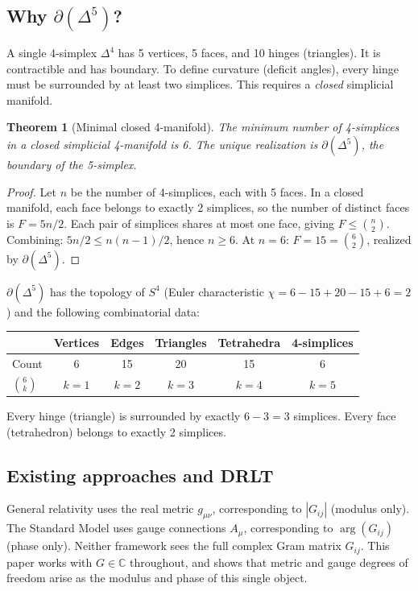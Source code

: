 \documentclass[12pt,a4paper]{article}
\newtheorem{theorem}{Theorem}[section]
\newcommand{\CC}{\mathbb{C}}
\begin{document}
\subsection{Why $\partial(\Delta^5)$?}

A single 4-simplex $\Delta^4$ has 5 vertices, 5 faces, and
10 hinges (triangles). It is contractible and has boundary.
To define curvature (deficit angles), every hinge must be
surrounded by at least two simplices.  This requires a
\emph{closed} simplicial manifold.

\begin{theorem}[Minimal closed 4-manifold]
\label{thm:minimal}
The minimum number of 4-simplices in a closed simplicial
4-manifold is 6.  The unique realization is $\partial(\Delta^5)$,
the boundary of the 5-simplex.
\end{theorem}

\begin{proof}
Let $n$ be the number of 4-simplices, each with 5 faces.
In a closed manifold, each face belongs to exactly 2 simplices,
so the number of distinct faces is $F = 5n/2$.
Each pair of simplices shares at most one face, giving
$F \leq \binom{n}{2}$.  Combining:
$5n/2 \leq n(n-1)/2$, hence $n \geq 6$.
At $n = 6$: $F = 15 = \binom{6}{2}$, realized by $\partial(\Delta^5)$.
\end{proof}

$\partial(\Delta^5)$ has the topology of $S^4$ (Euler
characteristic $\chi = 6 - 15 + 20 - 15 + 6 = 2$) and the
following combinatorial data:

\begin{center}
\begin{tabular}{lccccc}
\toprule
 & Vertices & Edges & Triangles & Tetrahedra & 4-simplices \\
\midrule
Count & 6 & 15 & 20 & 15 & 6 \\
$\binom{6}{k}$ & $k=1$ & $k=2$ & $k=3$ & $k=4$ & $k=5$ \\
\bottomrule
\end{tabular}
\end{center}

Every hinge (triangle) is surrounded by exactly $6-3 = 3$
simplices.  Every face (tetrahedron) belongs to exactly 2
simplices.

\subsection{Existing approaches and DRLT}

General relativity uses the real metric $g_{\mu\nu}$,
corresponding to $|G_{ij}|$ (modulus only).
The Standard Model uses gauge connections $A_\mu$,
corresponding to $\arg(G_{ij})$ (phase only).
Neither framework sees the full complex Gram matrix $G_{ij}$.
This paper works with $G \in \CC$ throughout, and shows that
metric and gauge degrees of freedom arise as the modulus and
phase of this single object.
\end{document}
